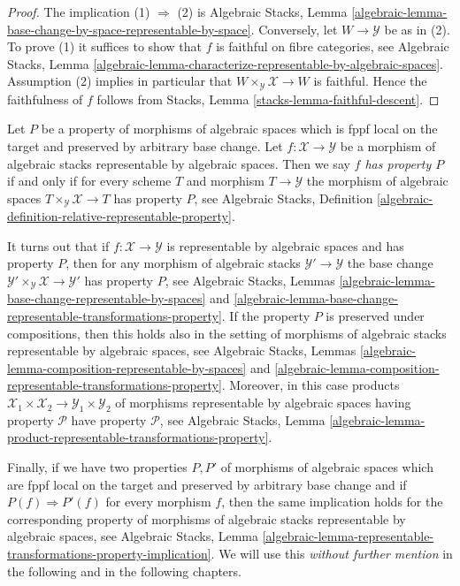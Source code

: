 \begin{proof}
The implication (1) $\Rightarrow$ (2) is
Algebraic Stacks,
Lemma \ref{algebraic-lemma-base-change-by-space-representable-by-space}.
Conversely, let $W \to \mathcal{Y}$ be as in (2). To prove (1) it
suffices to show that $f$ is faithful on fibre categories, see
Algebraic Stacks,
Lemma \ref{algebraic-lemma-characterize-representable-by-algebraic-spaces}.
Assumption (2) implies in particular that
$W \times_{\mathcal{Y}} \mathcal{X} \to W$ is faithful.
Hence the faithfulness of $f$ follows from
Stacks, Lemma \ref{stacks-lemma-faithful-descent}.
\end{proof}

\medskip\noindent
Let $P$ be a property of morphisms of algebraic spaces which is
fppf local on the target and preserved by arbitrary base change.
Let $f : \mathcal{X} \to \mathcal{Y}$ be a morphism of algebraic stacks
representable by algebraic spaces. Then we say
{\it $f$ has property $P$} if and only if for every scheme $T$
and morphism $T \to \mathcal{Y}$ the morphism of algebraic spaces
$T \times_{\mathcal{Y}} \mathcal{X} \to T$ has property $P$, see
Algebraic Stacks,
Definition \ref{algebraic-definition-relative-representable-property}.

\medskip\noindent
It turns out that if $f : \mathcal{X} \to \mathcal{Y}$ is representable
by algebraic spaces and has property $P$, then for any morphism of algebraic
stacks $\mathcal{Y}' \to \mathcal{Y}$ the base change
$\mathcal{Y}' \times_{\mathcal{Y}} \mathcal{X} \to \mathcal{Y}'$
has property $P$, see
Algebraic Stacks,
Lemmas \ref{algebraic-lemma-base-change-representable-by-spaces} and
\ref{algebraic-lemma-base-change-representable-transformations-property}.
If the property $P$ is preserved under compositions, then this holds
also in the setting of morphisms of algebraic stacks representable by
algebraic spaces, see
Algebraic Stacks,
Lemmas \ref{algebraic-lemma-composition-representable-by-spaces} and
\ref{algebraic-lemma-composition-representable-transformations-property}.
Moreover, in this case products
$\mathcal{X}_1 \times \mathcal{X}_2 \to \mathcal{Y}_1 \times \mathcal{Y}_2$
of morphisms representable by algebraic spaces having property $\mathcal{P}$
have property $\mathcal{P}$, see
Algebraic Stacks, Lemma
\ref{algebraic-lemma-product-representable-transformations-property}.

\medskip\noindent
Finally, if we have two properties $P, P'$ of morphisms of algebraic spaces
which are fppf local on the target and preserved by arbitrary base change
and if $P(f) \Rightarrow P'(f)$ for every morphism $f$, then the same
implication holds for the corresponding property of morphisms of algebraic
stacks representable by algebraic spaces, see
Algebraic Stacks, Lemma
\ref{algebraic-lemma-representable-transformations-property-implication}.
We will use this {\it without further mention} in the following and in the
following chapters.

